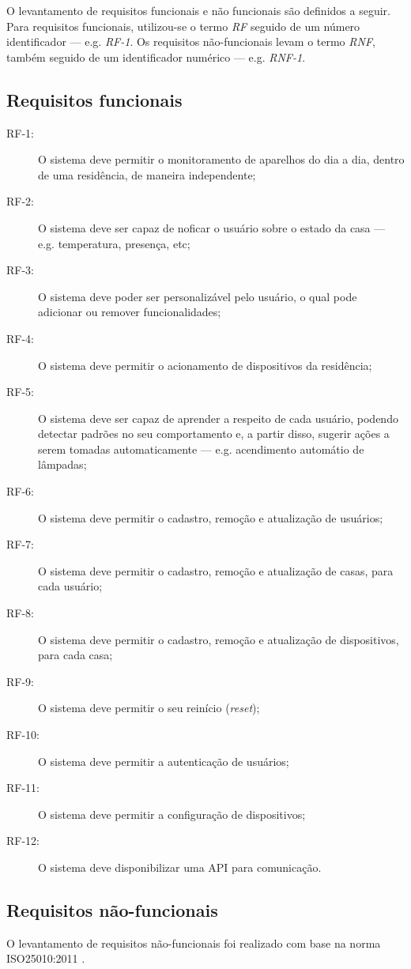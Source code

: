 O levantamento de requisitos funcionais e não funcionais são definidos a seguir. Para requisitos funcionais, utilizou-se o termo \emph{RF} seguido de um número identificador --- e.g. \emph{RF-1}. Os requisitos não-funcionais levam o termo \emph{RNF}, também seguido de um identificador numérico --- e.g. \emph{RNF-1}.

\subsection{Requisitos funcionais}
\begin{description}
\item[RF-1:]O sistema deve permitir o monitoramento de aparelhos do dia a dia, dentro de uma residência, de maneira independente;
\item[RF-2:]O sistema deve ser capaz de noficar o usuário sobre o estado da casa --- e.g. temperatura, presença, etc;
\item[RF-3:]O sistema deve poder ser personalizável pelo usuário, o qual pode adicionar ou remover funcionalidades;
\item[RF-4:]O sistema deve permitir o acionamento de dispositivos da residência;
\item[RF-5:]O sistema deve ser capaz de aprender a respeito de cada usuário, podendo detectar padrões no seu comportamento e, a partir disso, sugerir ações a serem tomadas automaticamente --- e.g. acendimento automátio de lâmpadas;
\item[RF-6:]O sistema deve permitir o cadastro, remoção e atualização de usuários;
\item[RF-7:]O sistema deve permitir o cadastro, remoção e atualização de casas, para cada usuário;
\item[RF-8:]O sistema deve permitir o cadastro, remoção e atualização de dispositivos, para cada casa;
\item[RF-9:]O sistema deve permitir o seu reinício (\emph{reset});
\item[RF-10:]O sistema deve permitir a autenticação de usuários;
\item[RF-11:]O sistema deve permitir a configuração de dispositivos;
\item[RF-12:]O sistema deve disponibilizar uma API para comunicação.

\end{description}

\subsection{Requisitos não-funcionais}
O levantamento de requisitos não-funcionais foi realizado com base na norma ISO25010:2011 \cite{iso25010}.

